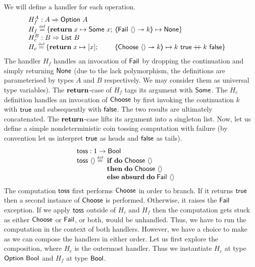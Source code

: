 \documentclass[12pt,phd,lfcs,twoside,openright,logo,leftchapter,normalheadings]{infthesis}
\theoremstyle{plain}
\theoremstyle{definition}
\begin{document}
We will define a handler for each operation.
%
\[
  \ba{@{~}l@{~}l}
     H^{A}_{f} : A \Harrow \Option~A\\
     H_{f} \defas \{ \Return\; x \mapsto \Some~x; &\OpCase{\Fail}{\Unit}{k} \mapsto \None \}\\
     H^B_{c} : B \Harrow \List~B\\
     H_{c} \defas \{ \Return\; x \mapsto [x]; &\OpCase{\Choose}{\Unit}{k} \mapsto k~\True \concat k~\False \}
   \ea
\]
%
The handler $H_f$ handles an invocation of $\mathsf{Fail}$ by dropping the
continuation and simply returning $\mathsf{None}$ (due to the lack
polymorphism, the definitions are parameterised by types $A$ and $B$
respectively. We may consider them as universal type variables). The
$\mathbf{return}$-case of $H_f$ tags its argument with $\mathsf{Some}$.
%
The $H_c$ definition handles an invocation of $\mathsf{Choose}$ by first
invoking the continuation $k$ with $\mathsf{true}$ and subsequently with
$\mathsf{false}$. The two results are ultimately concatenated. The
$\mathbf{return}$-case lifts its argument into a singleton list.
%
Now, let us define a simple nondeterministic coin tossing computation
with failure (by convention let us interpret $\mathsf{true}$ as heads and
$\mathsf{false}$ as tails).
%
\[
  \bl
    \toss : \UnitType \to \Bool\\
    \toss~\Unit \defas
                  \ba[t]{@{~}l}
                    \If\;\Do\;\Choose~\Unit\\
                    \Then\;\Do\;\Choose~\Unit\\
                    \Else\;\Absurd\;\Do\;\Fail~\Unit
                  \ea
  \el
\]
%
The computation $\mathsf{toss}$ first performs $\mathsf{Choose}$ in order to
branch. If it returns $\mathsf{true}$ then a second instance of $\mathsf{Choose}$ is
performed. Otherwise, it raises the $\mathsf{Fail}$ exception.
%
If we apply $\mathsf{toss}$ outside of $H_c$ and $H_f$ then the computation
gets stuck as either $\mathsf{Choose}$ or $\mathsf{Fail}$, or both, would be
unhandled. Thus, we have to run the computation in the context of both
handlers. However, we have a choice to make as we can compose the
handlers in either order. Let us first explore the composition, where
$H_c$ is the outermost handler. Thus we instantiate $H_c$ at type
$\mathsf{Option}~\mathsf{Bool}$ and $H_f$ at type $\mathsf{Bool}$.
%
\end{document}
